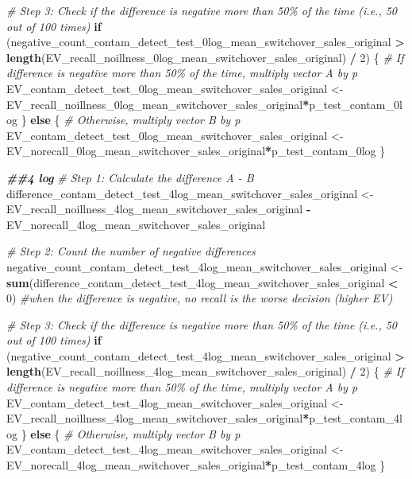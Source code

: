 \documentclass[
]{article}
\newenvironment{Shaded}{\begin{snugshade}}{\end{snugshade}}
\newcommand{\CommentTok}[1]{\textcolor[rgb]{0.56,0.35,0.01}{\textit{#1}}}
\newcommand{\ControlFlowTok}[1]{\textcolor[rgb]{0.13,0.29,0.53}{\textbf{#1}}}
\newcommand{\DecValTok}[1]{\textcolor[rgb]{0.00,0.00,0.81}{#1}}
\newcommand{\DocumentationTok}[1]{\textcolor[rgb]{0.56,0.35,0.01}{\textbf{\textit{#1}}}}
\newcommand{\FunctionTok}[1]{\textcolor[rgb]{0.13,0.29,0.53}{\textbf{#1}}}
\newcommand{\NormalTok}[1]{#1}
\newcommand{\OtherTok}[1]{\textcolor[rgb]{0.56,0.35,0.01}{#1}}
\newcommand{\SpecialCharTok}[1]{\textcolor[rgb]{0.81,0.36,0.00}{\textbf{#1}}}
\begin{document}
\begin{Shaded}
\begin{Highlighting}[]
\CommentTok{\# Step 3: Check if the difference is negative more than 50\% of the time (i.e., 50 out of 100 times)}
\ControlFlowTok{if}\NormalTok{ (negative\_count\_contam\_detect\_test\_0log\_mean\_switchover\_sales\_original }\SpecialCharTok{\textgreater{}} \FunctionTok{length}\NormalTok{(EV\_recall\_noillness\_0log\_mean\_switchover\_sales\_original) }\SpecialCharTok{/} \DecValTok{2}\NormalTok{) \{}
  \CommentTok{\# If difference is negative more than 50\% of the time, multiply vector A by p}
\NormalTok{  EV\_contam\_detect\_test\_0log\_mean\_switchover\_sales\_original }\OtherTok{\textless{}{-}}\NormalTok{ EV\_recall\_noillness\_0log\_mean\_switchover\_sales\_original}\SpecialCharTok{*}\NormalTok{p\_test\_contam\_0log}
\NormalTok{\} }\ControlFlowTok{else}\NormalTok{ \{}
  \CommentTok{\# Otherwise, multiply vector B by p}
\NormalTok{ EV\_contam\_detect\_test\_0log\_mean\_switchover\_sales\_original  }\OtherTok{\textless{}{-}}\NormalTok{ EV\_norecall\_0log\_mean\_switchover\_sales\_original}\SpecialCharTok{*}\NormalTok{p\_test\_contam\_0log}
\NormalTok{\}}



\DocumentationTok{\#\#4 log}
\CommentTok{\# Step 1: Calculate the difference A {-} B}
\NormalTok{difference\_contam\_detect\_test\_4log\_mean\_switchover\_sales\_original }\OtherTok{\textless{}{-}}\NormalTok{ EV\_recall\_noillness\_4log\_mean\_switchover\_sales\_original }\SpecialCharTok{{-}}\NormalTok{ EV\_norecall\_4log\_mean\_switchover\_sales\_original}

\CommentTok{\# Step 2: Count the number of negative differences}
\NormalTok{negative\_count\_contam\_detect\_test\_4log\_mean\_switchover\_sales\_original }\OtherTok{\textless{}{-}} \FunctionTok{sum}\NormalTok{(difference\_contam\_detect\_test\_4log\_mean\_switchover\_sales\_original }\SpecialCharTok{\textless{}} \DecValTok{0}\NormalTok{) }\CommentTok{\#when the difference is negative, no recall is the worse decision (higher EV)}

\CommentTok{\# Step 3: Check if the difference is negative more than 50\% of the time (i.e., 50 out of 100 times)}
\ControlFlowTok{if}\NormalTok{ (negative\_count\_contam\_detect\_test\_4log\_mean\_switchover\_sales\_original }\SpecialCharTok{\textgreater{}} \FunctionTok{length}\NormalTok{(EV\_recall\_noillness\_4log\_mean\_switchover\_sales\_original) }\SpecialCharTok{/} \DecValTok{2}\NormalTok{) \{}
  \CommentTok{\# If difference is negative more than 50\% of the time, multiply vector A by p}
\NormalTok{  EV\_contam\_detect\_test\_4log\_mean\_switchover\_sales\_original }\OtherTok{\textless{}{-}}\NormalTok{ EV\_recall\_noillness\_4log\_mean\_switchover\_sales\_original}\SpecialCharTok{*}\NormalTok{p\_test\_contam\_4log}
\NormalTok{\} }\ControlFlowTok{else}\NormalTok{ \{}
  \CommentTok{\# Otherwise, multiply vector B by p}
\NormalTok{ EV\_contam\_detect\_test\_4log\_mean\_switchover\_sales\_original  }\OtherTok{\textless{}{-}}\NormalTok{ EV\_norecall\_4log\_mean\_switchover\_sales\_original}\SpecialCharTok{*}\NormalTok{p\_test\_contam\_4log}
\NormalTok{\}}



\end{Highlighting}
\end{Shaded}
\end{document}
